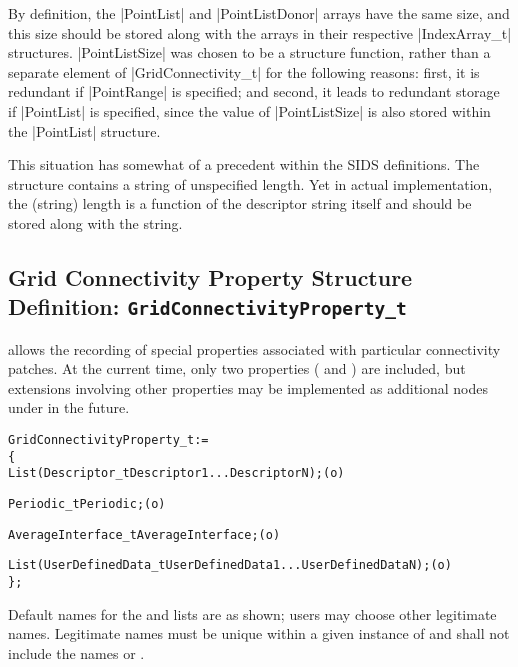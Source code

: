 By definition, the |PointList| and |PointListDonor| arrays have the
same size, and this size should be stored along with the arrays in
their respective |IndexArray_t| structures.
|PointListSize| was chosen to be a structure function, rather than a
separate element of |GridConnectivity_t| for the following reasons:
first, it is redundant if |PointRange| is specified; and second, it
leads to redundant storage if |PointList| is specified, since the value
of |PointListSize| is also stored within the |PointList| structure.

This situation has somewhat of a precedent within the SIDS definitions.
The structure  contains a string of unspecified length.
Yet in  actual implementation, the (string) length is a function of the
descriptor string itself and should be stored along with the string.

\subsection{Grid Connectivity Property Structure Definition: \texttt{GridConnectivityProperty\_t}}
\label{s:GridConnectivityProperty}

 allows the recording of special
properties associated with particular connectivity patches.
At the current time, only two properties ( and
) are included, but extensions involving
other properties may be implemented as additional nodes under
 in the future.

\begin{alltt}
  GridConnectivityProperty\_t :=
    \{
    List( Descriptor\_t Descriptor1 ... DescriptorN ) ;                      (o)

    Periodic\_t Periodic ;                                                   (o)

    AverageInterface\_t AverageInterface ;                                   (o)

    List( UserDefinedData\_t UserDefinedData1 ... UserDefinedDataN ) ;       (o)
    \} ;
\end{alltt}

\begin{notes}
\item
 Default names for the  and
 lists are as shown; users may choose other legitimate names.
 Legitimate names must be unique within a given instance of
  and shall not include the names
  or .
\end{notes}

